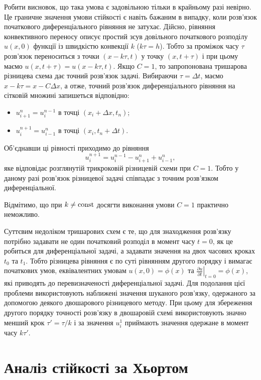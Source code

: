 Робити висновок, що така умова є задовільною тільки в крайньому разі невірно. Це граничне значення умови стійкості є навіть бажаним в випадку, коли розв'язок початкового диференціального рівняння не затухає. Дійсно, рівняння конвективного переносу описує простий зсув довільного початкового розподілу $u(x, 0)$ функції із швидкістю конвекції $k$ ($k \tau = h$). Тобто за проміжок часу $\tau$ розв'язок переноситься з точки $(x - k \tau, t)$ у точку $(x, t + \tau)$ і при цьому маємо $u(x, t + \tau) = u(x - k \tau, t)$. Якщо $C = 1$, то запропонована тришарова різницева схема дає точний розв'язок задачі. Вибираючи $\tau = \Delta t$, маємо $x - k \tau = x - C \Delta x$, а отже, точний розв'язок диференціального рівняння на сітковій множині запишеться відповідно:
\begin{itemize}
    \item $u_{i + 1}^n = u_i^{n - 1}$ в точці $(x_i + \Delta x, t_n)$;
    \item $u_i^{n + 1} = u_{i - 1}^n$ в точці $(x_i, t_n + \Delta t)$.
\end{itemize}

Об'єднавши ці рівності приходимо до рівняння
\begin{equation*}
    u_i^{n + 1} = u_i^{n - 1} - u_{i + 1}^n + u_{i - 1}^n,
\end{equation*}
яке відповідає розглянутій трикроковій різницевій схеми при $C = 1$. Тобто у даному разі розв'язок різницевої задачі співпадає з точним розв'язком диференціальної. \medskip

Відмітимо, що при $k \ne \operatorname{const}$ досягти виконання умови $C = 1$ практично неможливо. \medskip

Суттєвим недоліком тришарових схем є те, що для знаходження розв'язку потрібно задавати не один початковий розподіл в момент часу $t = 0$, як це робиться для диференціальної задачі, а задавати значення на двох часових кроках $t_0$ та $t_1$. Тобто різницева рівняння є по суті рівнянням другого порядку і вимагає початкових умов, еквівалентних умовам $u(x, 0) = \phi(x)$ та $\left. \frac{\partial u}{\partial t} \right|_{t = 0} = \phi(x)$, які приводять до перевизначеності диференціальної задачі. Для подолання цієї проблеми використовують наближені значення шуканого розв'язку, одержаного за допомогою деякого двошарового різницевого методу. При цьому для збереження другого порядку точності розв'язку в двошаровій схемі використовують значно менший крок $\tau' = \tau / k$ і за значення $u_i^1$ приймають значення одержане в момент часу $k \tau '$.

\section{Аналіз стійкості за Хьортом}

